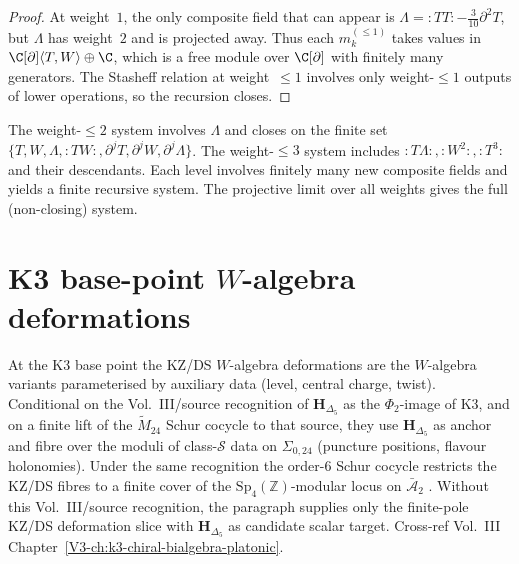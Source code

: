 \begin{proof}
At weight~$1$, the only composite field that can appear is $\Lambda =
{:}TT{:} - \tfrac{3}{10}\partial^2 T$, but $\Lambda$ has weight~$2$
and is projected away. Thus each $m_k^{(\le 1)}$ takes values in
$\C[\partial]\langle T, W \rangle \oplus \C$, which is a free module
over $\C[\partial]$ with finitely many generators. The Stasheff
relation at weight~$\le 1$ involves only weight-$\le 1$ outputs of
lower operations, so the recursion closes.
\end{proof}

\begin{remark}
\label{rem:weight-filtration-inductive}
The weight-$\le 2$ system involves $\Lambda$ and closes on the finite set
$\{T, W, \Lambda, :TW:, \partial^j T, \partial^j W, \partial^j \Lambda\}$.
The weight-$\le 3$ system includes
$:T\Lambda:, :W^2:, :T^3:$ and their descendants. Each level involves
finitely many new composite fields and yields a finite recursive system.
The projective limit over all weights gives the full (non-closing) system.
\end{remark}

\section{K3 base-point $W$-algebra deformations}
\label{sec:wac-supplement}

\begin{remark}
\label{rem:wac-1}
At the K3 base point the KZ/DS $W$-algebra deformations are the
$W$-algebra variants parameterised by auxiliary data (level, central
charge, twist). Conditional on the Vol.~III/source recognition of
$\mathbf H_{\Delta_5}$ as the $\Phi_2$-image of K3, and on a finite
lift of the $\widetilde M_{24}$ Schur cocycle to that source, they use
$\mathbf H_{\Delta_5}$ as anchor and fibre over the moduli of
class-$\mathcal S$ data on $\Sigma_{0,24}$ (puncture positions,
flavour holonomies). Under the same recognition the order-$6$ Schur
cocycle restricts the KZ/DS fibres to a finite cover of the
$\mathrm{Sp}_4(\mathbb Z)$-modular locus on $\bar{\mathcal A}_2$
\cite{ChengDuncanHarvey2014,Gaiotto2009}. Without this Vol.~III/source
recognition, the paragraph supplies only the finite-pole KZ/DS
deformation slice with $\mathbf H_{\Delta_5}$ as candidate scalar
target. Cross-ref Vol.~III Chapter~\ref{V3-ch:k3-chiral-bialgebra-platonic}.
\end{remark}

